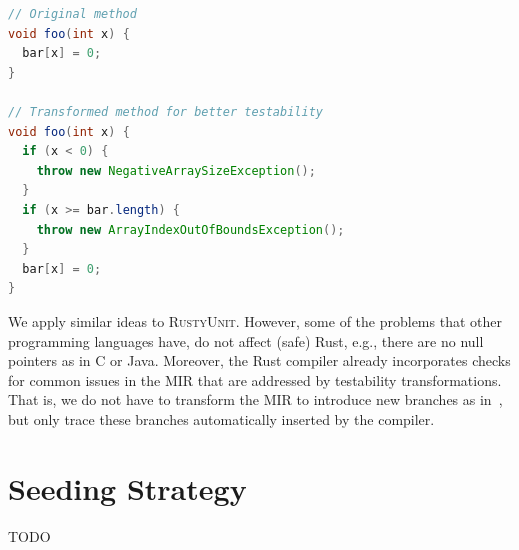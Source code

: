 \documentclass[paper=a4,%
  twoside,%
  BCOR4mm,%
  abstract=true,%
  toc=bibliography,%
  chapterprefix=true,%
  toc=bibliographynumbered,%
  open=right,%
  english,%
  pagesize=pdftex]{scrreprt}
\newcommand{\tech}{\textsc{RustyUnit}\xspace}
\newcommand{\mir}{\ac{MIR}\xspace}
\begin{document}
\begin{lstlisting}[language=Java, style=boxed, caption={Array access transformation in \textsc{EvoSuite} for Java}, label=lst:evosuite-array-access-transformation]
// Original method
void foo(int x) {
  bar[x] = 0;
}

// Transformed method for better testability
void foo(int x) {
  if (x < 0) {
    throw new NegativeArraySizeException();
  }
  if (x >= bar.length) {
    throw new ArrayIndexOutOfBoundsException();
  }
  bar[x] = 0;
}
\end{lstlisting}

We apply similar ideas to \tech. However, some of the problems that other programming languages have, do not affect (safe) Rust, e.g., there are no null pointers as in C or Java. Moreover, the Rust compiler already incorporates checks for common issues in the \mir that are addressed by testability transformations. That is, we do not have to transform the \mir to introduce new branches as in~, but only trace these branches automatically inserted by the compiler. 

\section{Seeding Strategy}
\label{sec:seeding-strategy}

TODO

\end{document}
